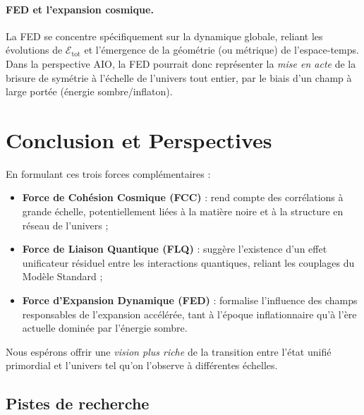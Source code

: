 \documentclass[12pt]{article}
\begin{document}
\paragraph{FED et l'expansion cosmique.}
La FED se concentre spécifiquement sur la dynamique globale, reliant les évolutions de 
$\mathcal{E}_{\mathrm{tot}}$ et l'émergence de la géométrie (ou métrique) de l'espace-temps. 
Dans la perspective AIO, la FED pourrait donc représenter la \emph{mise en acte} 
de la brisure de symétrie à l'échelle de l'univers tout entier, par le biais d'un champ 
à large portée (énergie sombre/inflaton).

\section{Conclusion et Perspectives}

En formulant ces trois forces complémentaires :
\begin{itemize}
    \item \textbf{Force de Cohésion Cosmique (FCC)} : rend compte des corrélations 
    à grande échelle, potentiellement liées à la matière noire et à la structure 
    en réseau de l'univers ;
    \item \textbf{Force de Liaison Quantique (FLQ)} : suggère l'existence d'un effet 
    unificateur résiduel entre les interactions quantiques, reliant les couplages 
    du Modèle Standard ;
    \item \textbf{Force d'Expansion Dynamique (FED)} : formalise l'influence 
    des champs responsables de l'expansion accélérée, tant à l'époque inflationnaire 
    qu'à l'ère actuelle dominée par l'énergie sombre.
\end{itemize}

Nous espérons offrir une \emph{vision plus riche} de la transition entre 
l'état unifié primordial et l'univers tel qu'on l'observe à différentes échelles. 

\subsection*{Pistes de recherche}
\end{document}
